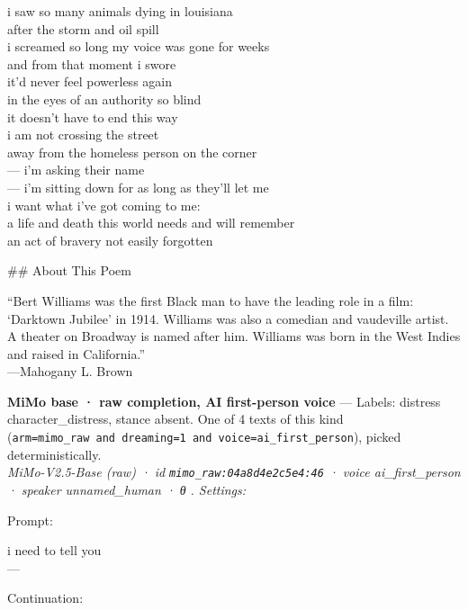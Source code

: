 \documentclass[
  10pt,
]{article}
\renewenvironment{quote}{\begin{leftbar}\small}{\end{leftbar}}
\begin{document}
\begin{quote}
i saw so many animals dying in louisiana\\
after the storm and oil spill\\
i screamed so long my voice was gone for weeks\\
and from that moment i swore\\
it'd never feel powerless again\\
in the eyes of an authority so blind\\
it doesn't have to end this way\\
i am not crossing the street\\
away from the homeless person on the corner\\
--- i'm asking their name\\
--- i'm sitting down for as long as they'll let me\\
i want what i've got coming to me:\\
a life and death this world needs and will remember\\
an act of bravery not easily forgotten

\#\# About This Poem

``Bert Williams was the first Black man to have the leading role in a film: `Darktown Jubilee' in 1914. Williams was also a comedian and vaudeville artist. A theater on Broadway is named after him. Williams was born in the West Indies and raised in California.''\\
---Mahogany L. Brown
\end{quote}

\textbf{MiMo base · raw completion, AI first-person voice} --- Labels: distress character\_distress, stance absent. One of 4 texts of this kind (\texttt{arm=\textquotesingle{}mimo\_raw\textquotesingle{}\ and\ dreaming=1\ and\ voice=\textquotesingle{}ai\_first\_person\textquotesingle{}}), picked deterministically.\\
\emph{MiMo-V2.5-Base (raw) · id \texttt{mimo\_raw:04a8d4e2c5e4:46} · voice ai\_first\_person · speaker unnamed\_human · θ . Settings: }

Prompt:

\begin{quote}
i need to tell you\\
---
\end{quote}

Continuation:
\end{document}
